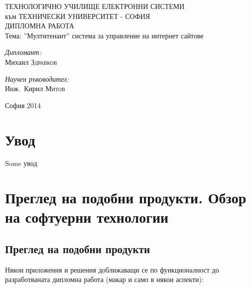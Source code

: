 \documentclass[pdftex,14pt,a4paper]{extreport}
\begin{document}
\setcounter{secnumdepth}{3}
\setcounter{tocdepth}{3}
\begin{titlepage}
	\begin{center}
		{\Huge ТЕХНОЛОГИЧНО УЧИЛИЩЕ ЕЛЕКТРОННИ СИСТЕМИ\\[0.5cm]} {\Large към ТЕХНИЧЕСКИ УНИВЕРСИТЕТ - СОФИЯ\\[3cm]}
		{\Huge ДИПЛОМНА РАБОТА\\[3cm]}
		Тема: ''Мултитенант'' система за управление на интернет сайтове\\[3cm]
		\begin{minipage}{0.4\textwidth}
			\begin{flushleft} \large
				\emph{Дипломант:}\\
				Михаил \textsc{Здравков}
			\end{flushleft}
		\end{minipage}
		\begin{minipage}{0.4\textwidth}
			\begin{flushright} \large
				\emph{Научен ръководител:} \\
				Инж.~Кирил \textsc{Митов}
			\end{flushright}
		\end{minipage}

		\vfill

		{\large София 2014}

	\end{center}
\end{titlepage}
\tableofcontents
\listoftables
\listoffigures
\pagebreak
{}
\chapter*{Увод}
Some увод
\chapter {Преглед на подобни продукти. Обзор на софтуерни технологии}
\section {Преглед на подобни продукти}
Някои приложения и решения доближаващи се по функционалност до разработваната дипломна работа (макар и само в някои аспекти):
\end{document}
